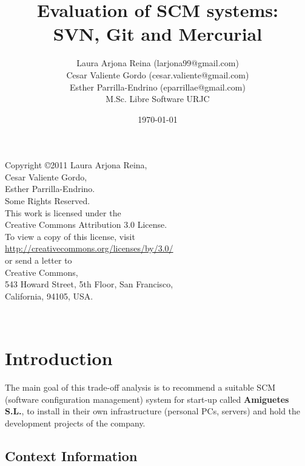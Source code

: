 \documentclass[a4paper,10pt]{article}
\title {Evaluation of SCM systems:\\ SVN, Git and Mercurial}
\author{Laura Arjona Reina (larjona99@gmail.com)\\Cesar Valiente Gordo
(cesar.valiente@gmail.com)\\Esther Parrilla-Endrino (eparrillae@gmail.com)\\
 M.Sc. Libre Software URJC}
\date{\today}
\begin{document}
\sloppy
\maketitle

\newpage
\thispagestyle{empty}
\vspace{5cm}
\begin{flushright}
\begin{large}
Copyright \copyright 2011 Laura Arjona Reina,\\ Cesar Valiente Gordo,\\ Esther
Parrilla-Endrino.\\
Some Rights Reserved.\\
This work is licensed under the\\
Creative Commons Attribution 3.0 License.\\
To view a copy of this license, visit\\
\url{http://creativecommons.org/licenses/by/3.0/}\\
or send a letter to\\
Creative Commons,\\
543 Howard Street, 5th Floor, San Francisco,\\
California, 94105, USA.\\
\end{large}
\end{flushright}
\vspace{13cm}
\begin{center}
\\
{\tiny\CcNote{\CcLongnameBy}}
\end{center}

\newpage
\tableofcontents
\newpage
\renewcommand{\refname}{Bibliography}
\addtolength{\parskip}{\baselineskip}

\section{Introduction}
The main goal of this trade-off analysis is to recommend a suitable SCM
(software configuration management) system for
start-up called \textbf{Amiguetes S.L.}, to install in their own infrastructure
(personal PCs, servers) and hold the development projects of the company.

\subsection{Context Information}
\end{document}
